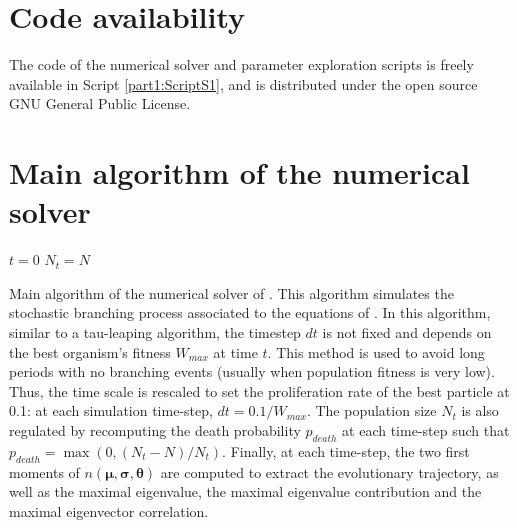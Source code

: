 
\section*{Code availability}

The code of the numerical solver and parameter exploration scripts is freely available in Script \ref{part1:ScriptS1}, and is distributed under the open source GNU General Public License.

\newpage


\section*{Main algorithm of the numerical solver}

\begin{algorithm}[!ht]
$t = 0$\;
$N_t = N$\;
\caption{Main algorithm of the numerical solver of {\sigmaFGM}. This algorithm simulates the stochastic branching process associated to the equations of {\sigmaFGM}. In this algorithm, similar to a tau-leaping algorithm, the timestep $dt$ is not fixed and depends on the best organism's fitness $W_{max}$ at time $t$. This method is used to avoid long periods with no branching events (usually when population fitness is very low). Thus, the time scale is rescaled to set the proliferation rate of the best particle at 0.1: at each simulation time-step, $dt = 0.1/W_{max}$. The population size $N_t$ is also regulated by recomputing the death probability $p_{death}$ at each time-step such that $p_{death} = \max \left(0, (N_t-N)/N_t \right)$. Finally, at each time-step, the two first moments of $n(\boldsymbol{\mu}, \boldsymbol{\sigma}, \boldsymbol{\theta})$ are computed to extract the evolutionary trajectory, as well as the maximal eigenvalue, the maximal eigenvalue contribution and the maximal eigenvector correlation.}
\label{part1:appendixS2:algorithm1}
\end{algorithm}

